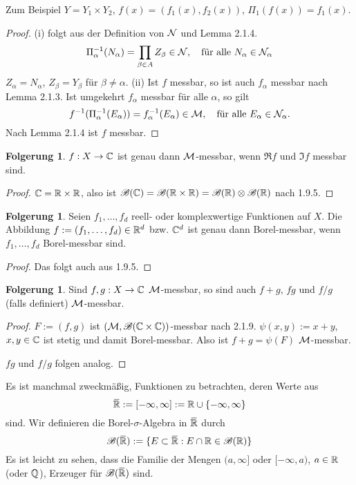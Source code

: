 \documentclass[
 a4paper,
 12pt,
 parskip=half
 ]{scrreprt}
\theoremstyle{plain}
\theoremstyle{definition}
\newtheorem{folg}[thm]{Folgerung}
\numberwithin{equation}{section}
\begin{document}
Zum Beispiel $Y = Y_1 \times Y_2$, $f(x) = ( f_1(x), f_2(x) )$, $\Pi_1(f(x)) = f_1(x)$.

\begin{proof}
 (i) folgt aus der Definition von $\mathcal{N}$ und Lemma 2.1.4.
 \[ \Pi^{-1}_\alpha ( N_\alpha ) = \prod_{\beta \in A} Z_\beta \in \mathcal{N}, \quad \text{für alle } N_\alpha \in \mathcal{N}_\alpha \]
 $Z_\alpha = N_\alpha$, $Z_\beta = Y_\beta$ für $\beta \ne \alpha$.
 (ii) Ist $f$ messbar, so ist auch $f_\alpha$ messbar nach Lemma 2.1.3. Ist umgekehrt $f_\alpha$ messbar für alle $\alpha$, so gilt
 \[ f^{-1}( \Pi_\alpha^{-1}( E_\alpha ) ) = f_\alpha^{-1} (E_\alpha) \in \mathcal{M}, \quad \text{für alle } E_\alpha \in \mathcal{N}_\alpha. \]
 Nach Lemma 2.1.4 ist $f$ messbar.
\end{proof}

\begin{folg}
 $f: X \to \mathbb{C}$ ist genau dann $\mathcal{M}$-messbar, wenn $\Re f$ und $\Im f$ messbar sind.
\end{folg}

\begin{proof}
 $\mathbb{C} = \mathbb{R} \times \mathbb{R}$, also ist $\mathscr{B}(\mathbb{C}) = \mathscr{B}( \mathbb{R} \times \mathbb{R} ) = \mathscr{B}( \mathbb{R} ) \otimes \mathscr{B}(\mathbb{R})$ nach 1.9.5.
\end{proof}

\begin{folg}
 Seien $f_1, \ldots, f_d$ reell- oder komplexwertige Funktionen auf $X$. Die Abbildung $f := (f_1, \ldots, f_d) \in \mathbb{R}^d$ bzw. $\mathbb{C}^d$ ist genau dann Borel-messbar, wenn $f_1, \ldots, f_d$ Borel-messbar sind.
\end{folg}

\begin{proof}
 Das folgt auch aus 1.9.5.
\end{proof}

\begin{folg}
 Sind $f,g: X \to \mathbb{C}$ $\mathcal{M}$-messbar, so sind auch $f+g$, $fg$ und $f/g$ (falls definiert) $\mathcal{M}$-messbar.
\end{folg}

\begin{proof}
 $F := (f,g)$ ist $(\mathcal{M},\mathscr{B}(\mathbb{C} \times \mathbb{C}))$-messbar nach 2.1.9. $\psi(x,y) := x + y$, $x,y \in \mathbb{C}$ ist stetig und damit Borel-messbar. Also ist $f+g = \psi(F)$ $\mathcal{M}$-messbar.
 
 $fg$ und $f/g$ folgen analog.
\end{proof}

Es ist manchmal zweckmäßig, Funktionen zu betrachten, deren Werte aus
\[ \realext := [-\infty,\infty] := \real \cup \{-\infty, \infty\} \]
sind. Wir definieren die Borel-$\sigma$-Algebra in $\realext$ durch 
\[ \borel(\realext) := \{ E \subset \realext : E \cap \real \in \borel( \real ) \} \]
Es ist leicht zu sehen, dass die Familie der Mengen $(a, \infty]$ oder $[-\infty,a)$, $a \in \mathbb{R}$ (oder $\mathbb{Q}$), Erzeuger für $\borel(\realext)$ sind.
\end{document}
